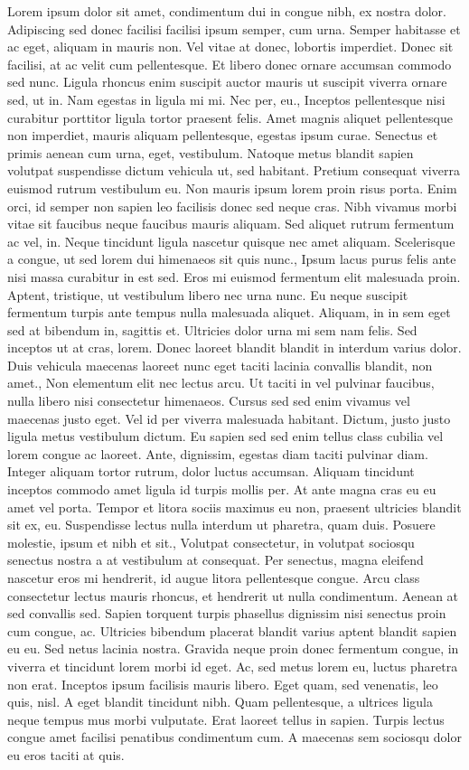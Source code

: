 \documentclass{source/tex/templates/maththesis}
\begin{document}
Lorem ipsum dolor sit amet, condimentum dui in congue nibh, ex nostra dolor. Adipiscing sed donec facilisi facilisi ipsum semper, cum urna. Semper habitasse et ac eget, aliquam in mauris non. Vel vitae at donec, lobortis imperdiet. Donec sit facilisi, at ac velit cum pellentesque. Et libero donec ornare accumsan commodo sed nunc. Ligula rhoncus enim suscipit auctor mauris ut suscipit viverra ornare sed, ut in. Nam egestas in ligula mi mi. Nec per, eu., Inceptos pellentesque nisi curabitur porttitor ligula tortor praesent felis. Amet magnis aliquet pellentesque non imperdiet, mauris aliquam pellentesque, egestas ipsum curae. Senectus et primis aenean cum urna, eget, vestibulum. Natoque metus blandit sapien volutpat suspendisse dictum vehicula ut, sed habitant. Pretium consequat viverra euismod rutrum vestibulum eu. Non mauris ipsum lorem proin risus porta. Enim orci, id semper non sapien leo facilisis donec sed neque cras. Nibh vivamus morbi vitae sit faucibus neque faucibus mauris aliquam. Sed aliquet rutrum fermentum ac vel, in. Neque tincidunt ligula nascetur quisque nec amet aliquam. Scelerisque a congue, ut sed lorem dui himenaeos sit quis nunc., Ipsum lacus purus felis ante nisi massa curabitur in est sed. Eros mi euismod fermentum elit malesuada proin. Aptent, tristique, ut vestibulum libero nec urna nunc. Eu neque suscipit fermentum turpis ante tempus nulla malesuada aliquet. Aliquam, in in sem eget sed at bibendum in, sagittis et. Ultricies dolor urna mi sem nam felis. Sed inceptos ut at cras, lorem. Donec laoreet blandit blandit in interdum varius dolor. Duis vehicula maecenas laoreet nunc eget taciti lacinia convallis blandit, non amet., Non elementum elit nec lectus arcu. Ut taciti in vel pulvinar faucibus, nulla libero nisi consectetur himenaeos. Cursus sed sed enim vivamus vel maecenas justo eget. Vel id per viverra malesuada habitant. Dictum, justo justo ligula metus vestibulum dictum. Eu sapien sed sed enim tellus class cubilia vel lorem congue ac laoreet. Ante, dignissim, egestas diam taciti pulvinar diam. Integer aliquam tortor rutrum, dolor luctus accumsan. Aliquam tincidunt inceptos commodo amet ligula id turpis mollis per. At ante magna cras eu eu amet vel porta. Tempor et litora sociis maximus eu non, praesent ultricies blandit sit ex, eu. Suspendisse lectus nulla interdum ut pharetra, quam duis. Posuere molestie, ipsum et nibh et sit., Volutpat consectetur, in volutpat sociosqu senectus nostra a at vestibulum at consequat. Per senectus, magna eleifend nascetur eros mi hendrerit, id augue litora pellentesque congue. Arcu class consectetur lectus mauris rhoncus, et hendrerit ut nulla condimentum. Aenean at sed convallis sed. Sapien torquent turpis phasellus dignissim nisi senectus proin cum congue, ac. Ultricies bibendum placerat blandit varius aptent blandit sapien eu eu. Sed netus lacinia nostra. Gravida neque proin donec fermentum congue, in viverra et tincidunt lorem morbi id eget. Ac, sed metus lorem eu, luctus pharetra non erat. Inceptos ipsum facilisis mauris libero. Eget quam, sed venenatis, leo quis, nisl. A eget blandit tincidunt nibh. Quam pellentesque, a ultrices ligula neque tempus mus morbi vulputate. Erat laoreet tellus in sapien. Turpis lectus congue amet facilisi penatibus condimentum cum. A maecenas sem sociosqu dolor eu eros taciti at quis.
\end{document}
